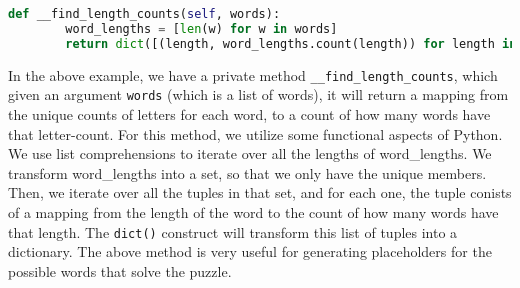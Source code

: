 \begin{minipage}[t]{1\linewidth}
\begin{lstlisting}[language=Python, %
  title={Bash}, label=bash1]
    def __find_length_counts(self, words):
        word_lengths = [len(w) for w in words]
        return dict([(length, word_lengths.count(length)) for length in set(word_lengths)])
\end{lstlisting}
\end{minipage}

In the above example, we have a private method \texttt{\_\_find\_length\_counts}, which given an argument \texttt{words} (which is a list of words), it will return a mapping from the unique counts of letters for each word, to a count of how many words have that letter-count. For this method, we utilize some functional aspects of Python. We use list comprehensions to iterate over all the lengths of word\_lengths. We transform word\_lengths into a set, so that we only have the unique members. Then, we iterate over all the tuples in that set, and for each one, the tuple conists of a mapping from the length of the word to the count of how many words have that length. The \texttt{dict()} construct will transform this list of tuples into a dictionary.
	The above method is very useful for generating placeholders for the possible words that solve the puzzle.

